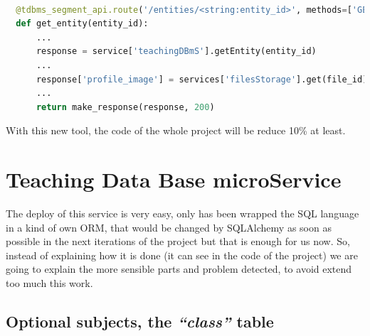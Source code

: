 \begin{lstlisting}[language=python,frame=none]

  @tdbms_segment_api.route('/entities/<string:entity_id>', methods=['GET'])
  def get_entity(entity_id):
      ...
      response = service['teachingDBmS'].getEntity(entity_id)
      ...
      response['profile_image'] = services['filesStorage'].get(file_id)
      ...
      return make_response(response, 200)
\end{lstlisting}

\noindent With this new tool, the code of the whole project will be reduce 10\% at least.

\section{Teaching Data Base microService}

The deploy of this service is very easy, only has been wrapped the SQL language
in a kind of own ORM, that would be changed by SQLAlchemy as soon as possible in
the next iterations of the project but that is enough for us now. So, instead of
explaining how it is done (it can see in the code of the project) we are going to
explain the more sensible parts and problem detected, to avoid extend too much this
 work.

\subsection{Optional subjects, the \textit{``class''} table}


